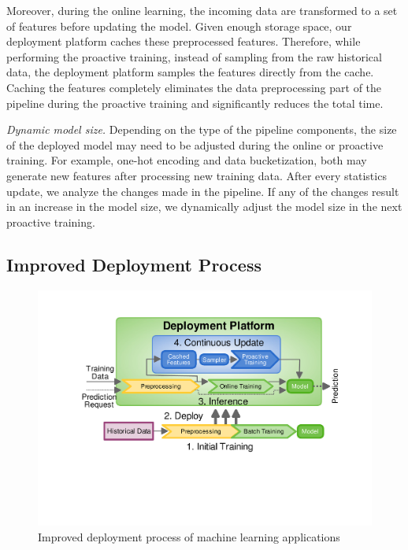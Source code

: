 Moreover, during the online learning, the incoming data are transformed to a set of features before updating the model.
Given enough storage space, our deployment platform caches these preprocessed features.
Therefore, while performing the proactive training, instead of sampling from the raw historical data, the deployment platform samples the features directly from the cache.
Caching the features completely eliminates the data preprocessing part of the pipeline during the proactive training and significantly reduces the total time.

\textit{Dynamic model size.}
Depending on the type of the pipeline components, the size of the deployed model may need to be adjusted during the online or proactive training.
For example, one-hot encoding and data bucketization, both may generate new features after processing new training data.
After every statistics update, we analyze the changes made in the pipeline.
If any of the changes result in an increase in the model size, we dynamically adjust the model size in the next proactive training. 


\subsection{Improved Deployment Process}
\begin{figure}[t]
\centering
\includegraphics[width=\columnwidth]{../images/generic-improved-example-v2.pdf}
\caption{Improved deployment process of machine learning applications}
\label{fig:improved-example}
\end{figure}

